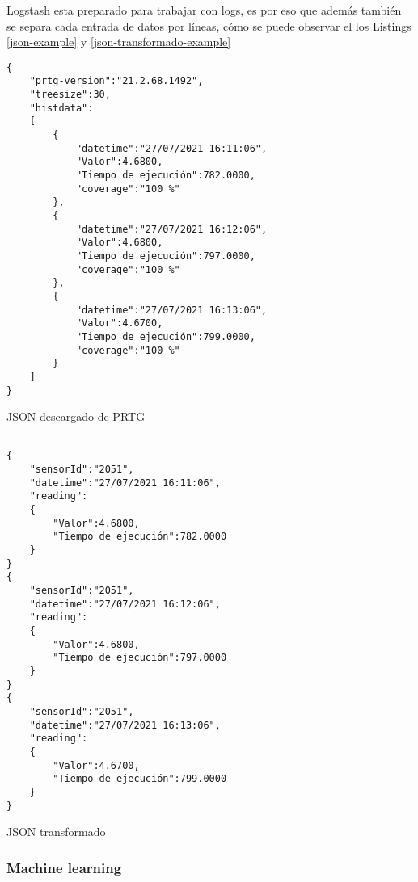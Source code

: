 Logstash esta preparado para trabajar con logs, es por eso que además también se separa cada entrada de datos por líneas, cómo se puede observar el los Listings \ref{json-example} y \ref{json-transformado-example}

\begin{listing}
\begin{verbatim}
{
    "prtg-version":"21.2.68.1492",
    "treesize":30,
    "histdata":
    [
        {
            "datetime":"27/07/2021 16:11:06",
            "Valor":4.6800,
            "Tiempo de ejecución":782.0000,
            "coverage":"100 %"
        },
        {
            "datetime":"27/07/2021 16:12:06",
            "Valor":4.6800,
            "Tiempo de ejecución":797.0000,
            "coverage":"100 %"
        },
        {
            "datetime":"27/07/2021 16:13:06",
            "Valor":4.6700,
            "Tiempo de ejecución":799.0000,
            "coverage":"100 %"
        }
    ]
}

\end{verbatim}
\caption{JSON descargado de PRTG} 
\label{json-example}
\end{listing}

\begin{listing}
\begin{verbatim}

{
    "sensorId":"2051",
    "datetime":"27/07/2021 16:11:06",
    "reading": 
    {
        "Valor":4.6800,
        "Tiempo de ejecución":782.0000
    }
}
{
    "sensorId":"2051",
    "datetime":"27/07/2021 16:12:06",
    "reading": 
    {
        "Valor":4.6800,
        "Tiempo de ejecución":797.0000
    }
}
{
    "sensorId":"2051",
    "datetime":"27/07/2021 16:13:06",
    "reading": 
    {
        "Valor":4.6700,
        "Tiempo de ejecución":799.0000
    }
}

\end{verbatim}
\caption{JSON transformado} 
\label{json-transformado-example}
\end{listing}

\newpage



\subsubsection{Machine learning}

